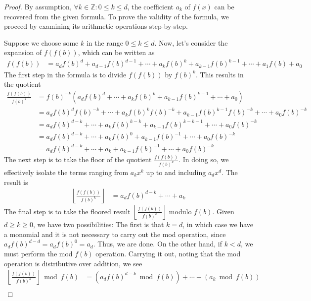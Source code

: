 \documentclass[11pt,reqno]{article}
\theoremstyle{plain}
\theoremstyle{definition}
\newcommand{\floor}[1]{\left\lfloor #1 \right\rfloor}
\begin{document}
\begin{proof}
By assumption, $\forall k \in \mathbb{Z} : 0 \leq k \leq d$, the coefficient $a_k$ of $f(x)$ can be recovered from the given formula. To prove the validity of the formula, we proceed by examining its arithmetic operations step-by-step.

Suppose we choose some $k$ in the range $0 \leq k \leq d$. Now, let's consider the expansion of $f(f(b))$, which can be written as
\begin{align*}
f(f(b)) &= a_d f(b)^d + a_{d-1} f(b)^{d-1} + \cdots + a_{k} f(b)^{k} + a_{k-1} f(b)^{k-1} + \cdots + a_1 f(b) + a_0
\end{align*}
The first step in the formula is to divide $f(f(b))$ by $f(b)^{k}$. This results in the quotient
\begin{align*}
\frac{f(f(b))}{f(b)^k} &= f(b)^{-k} (a_d f(b)^d  + \cdots + a_{k} f(b)^{k} + a_{k-1} f(b)^{k-1} + \cdots + a_0) \\
&= a_d f(b)^d f(b)^{-k} + \cdots + a_{k} f(b)^{k} f(b)^{-k} + a_{k-1} f(b)^{k-1} f(b)^{-k} + \cdots + a_0 f(b)^{-k} \\
&= a_d f(b)^{d-k} + \cdots + a_{k} f(b)^{k-k} + a_{k-1} f(b)^{k-k-1} + \cdots + a_0 f(b)^{-k}  \\
&= a_d f(b)^{d-k} + \cdots + a_{k} f(b)^{0} + a_{k-1} f(b)^{-1} + \cdots + a_0 f(b)^{-k}  \\
&= a_d f(b)^{d-k} + \cdots + a_{k} + a_{k-1} f(b)^{-1} + \cdots + a_0 f(b)^{-k}
\end{align*}
The next step is to take the floor of the quotient $\frac{f(f(b))}{f(b)^k}$. In doing so, we effectively isolate the terms ranging from $a_k x^k$ up to and including $a_d x^d$. The result is
\begin{align*}
\floor{\frac{f(f(b))}{f(b)^k}} &= a_d f(b)^{d-k} + \cdots + a_{k}
\end{align*}
The final step is to take the floored result $\floor{\frac{f(f(b))}{f(b)^k}}$ modulo $f(b)$. Given $d \geq k \geq 0$, we have two possibilities: The first is that $k = d$, in which case we have a monomial and it is not necessary to carry out the mod operation, since $a_d f(b)^{d-d} = a_d f(b)^{0} = a_d$. Thus, we are done. On the other hand, if $k < d$, we must perform the mod $f(b)$ operation. Carrying it out, noting that the mod operation is distributive over addition, we see
\begin{align*}
\floor{\frac{f(f(b))}{f(b)^{k}}} \bmod{f(b)} &= (a_d f(b)^{d-k} \bmod{f(b)}) + \cdots + (a_{k} \bmod{f(b)}) \\

\end{align*}
\end{proof}
\end{document}
